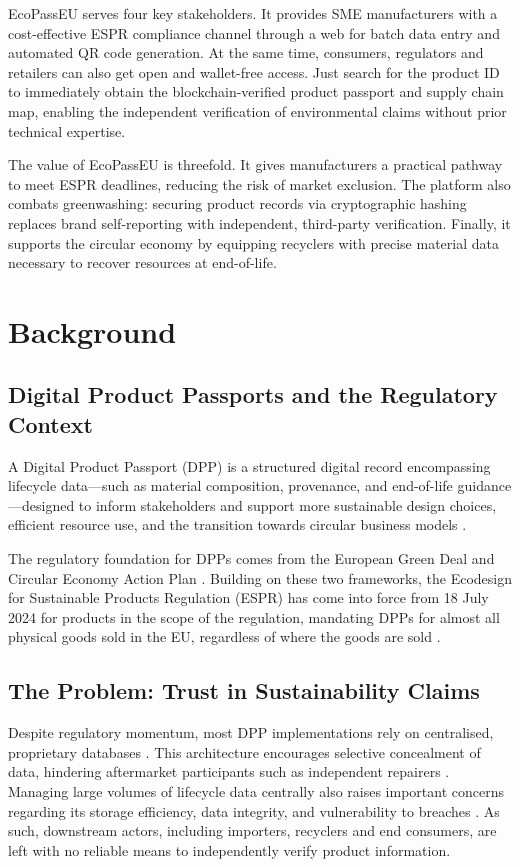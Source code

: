 \documentclass[runningheads]{llncs}
\begin{document}
	EcoPassEU serves four key stakeholders. 
	It provides SME manufacturers with a cost-effective ESPR compliance channel through a web for batch data entry and automated QR code generation. 
	At the same time, consumers, regulators and retailers can also get open and wallet-free access. 
	Just search for the product ID to immediately obtain the blockchain-verified product passport and supply chain map, enabling the independent verification of environmental claims without prior technical expertise.
	
	The value of EcoPassEU is threefold.
	It gives manufacturers a practical pathway to meet ESPR deadlines, 
	reducing the risk of market exclusion.
	The platform also combats greenwashing: securing product records 
	via cryptographic hashing replaces brand self-reporting with 
	independent, third-party verification.
	Finally, it supports the circular economy by equipping recyclers 
	with precise material data necessary to recover resources at 
	end-of-life.
	
	
	
	
	
	
	\section{Background}
	\subsection{Digital Product Passports and the Regulatory Context}
	A Digital Product Passport (DPP) is a structured digital record encompassing lifecycle data—such as material composition, provenance, and end-of-life guidance—designed to inform stakeholders and support more sustainable design choices, efficient resource use, and the transition towards circular business models
	\cite{Adisorn2021Towards,Basal2024Digital,VanCapelleveen2023The,Jansen2023Stop}.
	
	
	The regulatory foundation for DPPs comes from the European Green Deal and Circular Economy Action Plan \cite{eu_green_deal_2019,ceap_2020}. Building on these two frameworks, the Ecodesign for Sustainable Products Regulation (ESPR) has come into force from 18 July 2024 for products in the scope of the regulation, mandating DPPs for almost all physical goods sold in the EU, regardless of where the goods are sold \cite{circularise_dpp_2025}.
	
	\subsection{The Problem: Trust in Sustainability Claims}
	Despite regulatory momentum, most DPP implementations rely on centralised, proprietary databases \cite{Psarommatis2024Digital}. This architecture encourages selective concealment of data, hindering aftermarket participants such as independent repairers \cite{Ducuing2023Data}. Managing large volumes of lifecycle data centrally also raises important concerns regarding its storage efficiency, data integrity, and vulnerability to breaches \cite{Voulgaridis2024Digital}.
	As such, downstream actors, including importers, recyclers and end consumers, are left with no reliable means to independently verify product information.
	
\end{document}
